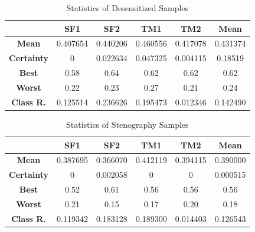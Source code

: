 \documentclass[conference]{IEEEtran}
\begin{document}
\begin{table}[!t]
    \centering
    \caption{Statistics of Desensitized Samples}
    \begin{tabular}{|c|c|c|c|c|c|}
        \hline
        & \textbf{SF1} & \textbf{SF2} & \textbf{TM1} & \textbf{TM2} & \textbf{Mean} \\
        \hline
        \textbf{Mean} & 0.407654 & 0.440206 & 0.460556 & 0.417078 & 0.431374 \\
        \hline
        \textbf{Certainty} & 0 & 0.022634 & 0.047325 & 0.004115 & 0.18519 \\
        \hline
        \textbf{Best} & 0.58 & 0.64 & 0.62 & 0.62 & 0.62 \\
        \hline
        \textbf{Worst} & 0.22 & 0.23 & 0.27 & 0.21 & 0.24 \\
        \hline
        \textbf{Class R.} & 0.125514 & 0.236626 & 0.195473 & 0.012346 & 0.142490 \\
        \hline
    \end{tabular}
    \label{tab:st_des}
\end{table}

\begin{table}[!t]
    \centering
    \caption{Statistics of Stenography Samples}
    \begin{tabular}{|c|c|c|c|c|c|}
        \hline
        & \textbf{SF1} & \textbf{SF2} & \textbf{TM1} & \textbf{TM2} & \textbf{Mean} \\
        \hline
        \textbf{Mean} & 0.387695 & 0.366070 & 0.412119 & 0.394115 & 0.390000 \\
        \hline
        \textbf{Certainty} & 0 & 0.002058 & 0 & 0 & 0.000515 \\
        \hline
        \textbf{Best} & 0.52 & 0.61 & 0.56 & 0.56 & 0.56 \\
        \hline
        \textbf{Worst} & 0.21 & 0.15 & 0.17 & 0.20 & 0.18 \\
        \hline
        \textbf{Class R.} & 0.119342 & 0.183128 & 0.189300 & 0.014403 & 0.126543 \\
        \hline
    \end{tabular}
    \label{tab:st_msg}
\end{table}
\end{document}
